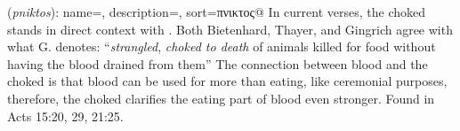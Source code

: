 \item[Choked,]

(\textit{pniktos}):
{
    name=,
    description={},
    sort=πνικτος@
}
In current verses, the choked stands in direct context with . Both Bietenhard, Thayer, and Gingrich agree with what G. denotes: ``\emph{strangled}, \emph{choked to death} of animals killed for food without having the blood drained from them'' The connection between blood and the choked is that blood can be used for more than eating, like ceremonial purposes, therefore, the choked clarifies the eating part of blood even stronger.
Found in Acts 15:20, 29, 21:25.
